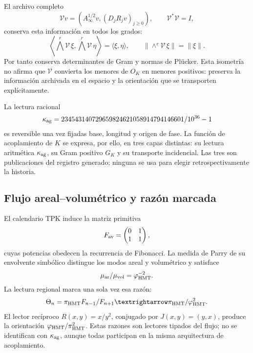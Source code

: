 El archivo completo
\[
 \mathcal Vv=\left(A_\infty^{1/2}v,(D_jR_jv)_{j\ge0}\right),
 \qquad\mathcal V^*\mathcal V=I,
\]
conserva esta información en todos los grados:
\begin{equation}
 \left\langle\bigwedge^r\mathcal V\,\xi,
 \bigwedge^r\mathcal V\,\eta\right\rangle
 =\langle\xi,\eta\rangle,
 \qquad
 \|\wedge^r\mathcal V\,\xi\|=\|\xi\|.
 \label{geometria_positiva:eq:exterior-isometry}
\end{equation}
Por tanto conserva determinantes de Gram y normas de Plücker. Esta isometría
no afirma que \(\mathcal V\) convierta los menores de \(O_K\) en menores
positivos: preserva la información archivada en el espacio y la orientación
que se transporten explícitamente.

La lectura racional
\[
 \kappa_{\rm ag}=
 \frac{234543140729659824621058914794146601}{10^{36}-1}
\]
es reversible una vez fijadas base, longitud y origen de fase. La función de
acoplamiento de \(K\) se expresa, por ello, en tres capas distintas: su lectura
aritmética \(\kappa_{\rm ag}\), su Gram positivo \(G_K\) y su transporte
incidencial. Las tres son publicaciones del registro generado; ninguna se usa
para elegir retrospectivamente la historia.

\subsection{Flujo areal--volumétrico y razón marcada}

El calendario TPK induce la matriz primitiva
\[
 F_{\rm av}=\begin{pmatrix}0&1\\1&1\end{pmatrix},
\]
cuyas potencias obedecen la recurrencia de Fibonacci. La medida de Parry de su
envolvente simbólico distingue los modos areal y volumétrico y satisface
\begin{equation}
 \frac{\mu_{\rm ar}}{\mu_{\rm vol}}=\varphi_{\rm HMT}^{-2}.
 \label{geometria_positiva:eq:area-volume-ratio}
\end{equation}
La lectura regional marca una sola vez esa razón:
\begin{equation}
 \Theta_n=\pi_{\rm HMT}\frac{F_{n-1}}{F_{n+1}}
 \longrightarrow\frac{\pi_{\rm HMT}}{\varphi_{\rm HMT}^2}.
 \label{geometria_positiva:eq:marked-area-volume}
\end{equation}
El lector recíproco
\(R(x,y)=x/y^2\), conjugado por \(J(x,y)=(y,x)\), produce la orientación
\(\varphi_{\rm HMT}/\pi_{\rm HMT}^2\). Estas razones son lectores tipados del
flujo; no se identifican con \(\kappa_{\rm ag}\), aunque todas participan en
la misma arquitectura de acoplamiento.

